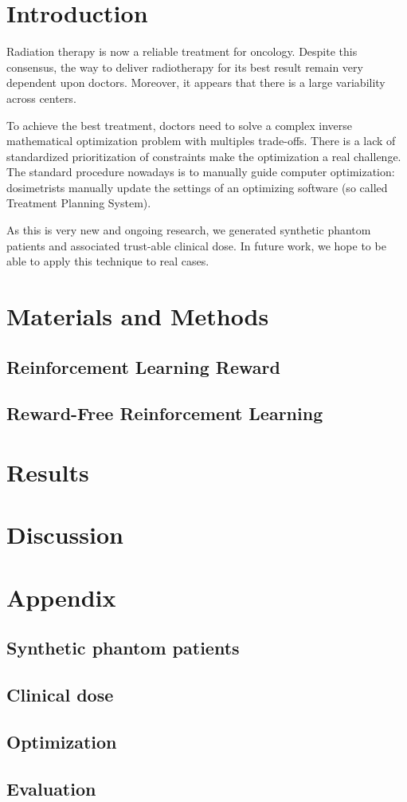 \section{Introduction}

Radiation therapy is now a reliable treatment for oncology.
Despite this consensus, the way to deliver radiotherapy for its best result remain very dependent upon doctors.
Moreover, it appears that there is a large variability across centers.

To achieve the best treatment, doctors need to solve a complex inverse mathematical optimization problem with multiples trade-offs.
There is a lack of standardized prioritization of constraints make the optimization a real challenge.
The standard procedure nowadays is to manually guide computer optimization: dosimetrists manually update the settings of an optimizing software (so called Treatment Planning System).


As this is very new and ongoing research, we generated synthetic phantom patients and associated trust-able clinical dose.
In future work, we hope to be able to apply this technique to real cases.

\section{Materials and Methods}

\subsection{Reinforcement Learning Reward}

\subsection{Reward-Free Reinforcement Learning}


\section{Results}

\section{Discussion}



\section*{Appendix}

\subsection*{Synthetic phantom patients}

\subsection*{Clinical dose}

\subsection*{Optimization}

\subsection*{Evaluation}
